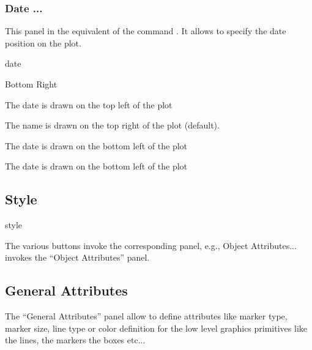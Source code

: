 \newpage

\subsubsection{Date ...}
This panel in the equivalent of the \XPAW{} command . It
allows to specify the date position on the plot.

\begin{PAWf}[.2]{date}
\begin{DLsf}{Bottom Right}
\item[Top Left]     The date is drawn on the top left of the plot
\item[Top Right]    The name is drawn on the top right of the plot
                    (default).
\item[Bottom Left]  The date is drawn on the bottom left of the plot
\item[Bottom Right] The date is drawn on the bottom left of the plot
\end{DLsf}
\end{PAWf}


\subsection{Style}

\begin{PAWf}[.6]{style}
\par
The various buttons invoke the corresponding panel, e.g., 
\textsf{Object Attributes...} invokes the ``Object Attributes'' panel.
\end{PAWf}

\subsection{General Attributes}

The ``General Attributes'' panel allow to define attributes like marker
type, marker size, line type or color definition for the low level graphics
primitives like the lines, the markers the boxes etc...


